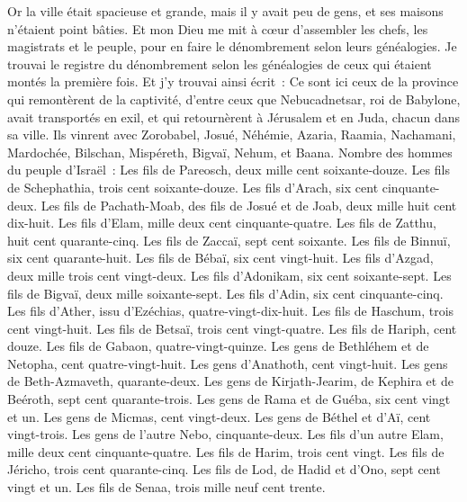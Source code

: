 \begin{multicols}{2}
Or la ville était spacieuse et grande, mais il y avait peu de gens, et ses maisons n'étaient point bâties.
Et mon Dieu me mit à cœur d'assembler les chefs, les magistrats et le peuple, pour en faire le dénombrement selon leurs généalogies. Je trouvai le registre du dénombrement selon les généalogies de ceux qui étaient montés la première fois. Et j'y trouvai ainsi écrit~:
Ce sont ici ceux de la province qui remontèrent de la captivité, d'entre ceux que Nebucadnetsar, roi de Babylone, avait transportés en exil, et qui retournèrent à Jérusalem et en Juda, chacun dans sa ville.
Ils vinrent avec Zorobabel, Josué, Néhémie, Azaria, Raamia, Nachamani, Mardochée, Bilschan, Mispéreth, Bigvaï, Nehum, et Baana. Nombre des hommes du peuple d'Israël~:
Les fils de Pareosch, deux mille cent soixante-douze.
Les fils de Schephathia, trois cent soixante-douze.
Les fils d'Arach, six cent cinquante-deux.
Les fils de Pachath-Moab, des fils de Josué et de Joab, deux mille huit cent dix-huit.
Les fils d'Elam, mille deux cent cinquante-quatre.
Les fils de Zatthu, huit cent quarante-cinq.
Les fils de Zaccaï, sept cent soixante.
Les fils de Binnuï, six cent quarante-huit.
Les fils de Bébaï, six cent vingt-huit.
Les fils d'Azgad, deux mille trois cent vingt-deux.
Les fils d'Adonikam, six cent soixante-sept.
Les fils de Bigvaï, deux mille soixante-sept.
Les fils d'Adin, six cent cinquante-cinq.
Les fils d'Ather, issu d'Ezéchias, quatre-vingt-dix-huit.
Les fils de Haschum, trois cent vingt-huit.
Les fils de Betsaï, trois cent vingt-quatre.
Les fils de Hariph, cent douze.
Les fils de Gabaon, quatre-vingt-quinze.
Les gens de Bethléhem et de Netopha, cent quatre-vingt-huit.
Les gens d'Anathoth, cent vingt-huit.
Les gens de Beth-Azmaveth, quarante-deux.
Les gens de Kirjath-Jearim, de Kephira et de Beéroth, sept cent quarante-trois.
Les gens de Rama et de Guéba, six cent vingt et un.
Les gens de Micmas, cent vingt-deux.
Les gens de Béthel et d'Aï, cent vingt-trois.
Les gens de l'autre Nebo, cinquante-deux.
Les fils d'un autre Elam, mille deux cent cinquante-quatre.
Les fils de Harim, trois cent vingt.
Les fils de Jéricho, trois cent quarante-cinq.
Les fils de Lod, de Hadid et d'Ono, sept cent vingt et un.
Les fils de Senaa, trois mille neuf cent trente.

\end{multicols}
